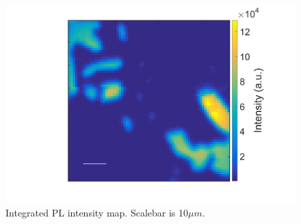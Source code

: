 \begin{figure}[H]
	\begin{center}
		\includegraphics[scale=0.3]{Heterostructures/PLIntensityMap11.png}
		\caption{Integrated PL intensity map. Scalebar is 10$\mu m$.}
		\label{fig:HeterostructuresPLIntensityMap11}
	\end{center}
\end{figure}

